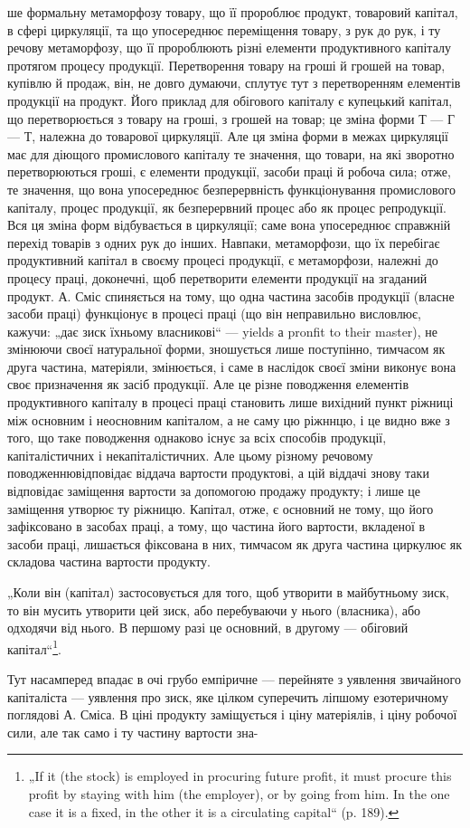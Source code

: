 ше формальну метаморфозу товару, що її пророблює продукт, товаровий
капітал, в сфері циркуляції, та що упосереднює переміщення товару,
з рук до рук, і ту речову метаморфозу, що її пророблюють різні елементи
продуктивного капіталу протягом процесу продукції. Перетворення
товару на гроші й грошей на товар, купівлю й продаж, він, не довго
думаючи, сплутує тут з перетворенням елементів продукції на продукт.
Його приклад для обігового капіталу є купецький капітал, що перетворюється
з товару на гроші, з грошей на товар; це зміна форми Т — Г — Т,
належна до товарової циркуляції. Але ця зміна форми в межах циркуляції
має для діющого промислового капіталу те значення, що товари, на
які зворотно перетворюються гроші, є елементи продукції, засоби праці
й робоча сила; отже, те значення, що вона упосереднює безперервність
функціонування промислового капіталу, процес продукції, як безперервний
процес або як процес репродукції. Вся ця зміна форм відбувається
в циркуляції; саме вона упосереднює справжній перехід товарів з
одних рук до інших. Навпаки, метаморфози, що їх перебігає продуктивний
капітал в своєму процесі продукції, є метаморфози, належні до
процесу праці, доконечні, щоб перетворити елементи продукції на
згаданий продукт. А. Сміс спиняється на тому, що одна частина засобів
продукції (власне засоби праці) функціонує в процесі праці (що він
неправильно висловлює, кажучи: „дає зиск їхньому власникові“ — yields а
pronfit to their master), не змінюючи своєї натуральної форми, зношується
лише поступінно, тимчасом як друга частина, матеріяли, змінюється, і
саме в наслідок своєї зміни виконує вона своє призначення як засіб продукції.
Але це різне поводження елементів продуктивного капіталу в
процесі праці становить лише вихідний пункт ріжниці між основним і неосновним
капіталом, а не саму цю ріжннцю, і це видно вже з того, що
таке поводження однаково існує за всіх способів продукції, капіталістичних
і некапіталістичних. Але цьому різному речовому поводженнювідповідає
віддача вартости продуктові, а цій віддачі знову таки відповідає
заміщення вартости за допомогою продажу продукту; і лише це
заміщення утворює ту ріжницю. Капітал, отже, є основний не тому, що
його зафіксовано в засобах праці, а тому, що частина його вартости,
вкладеної в засоби праці, лишається фіксована в них, тимчасом як друга
частина циркулює як складова частина вартости продукту.

„Коли він (капітал) застосовується для того, щоб утворити в майбутньому
зиск, то він мусить утворити цей зиск, або перебуваючи у
нього (власника), або одходячи від нього. В першому разі це основний,
в другому — обіговий капітал“\footnote*{
„If it (the stock) is employed in procuring future profit, it must procure this
profit by staying with him (the employer), or by going from him. In the one case
it is a fixed, in the other it is a circulating capital“ (p. 189).
}.

Тут насамперед впадає в очі грубо емпіричне — перейняте з уявлення
звичайного капіталіста — уявлення про зиск, яке цілком суперечить ліпшому
езотеричному поглядові А. Сміса. В ціні продукту заміщується і ціну
матеріялів, і ціну робочої сили, але так само і ту частину вартости зна-